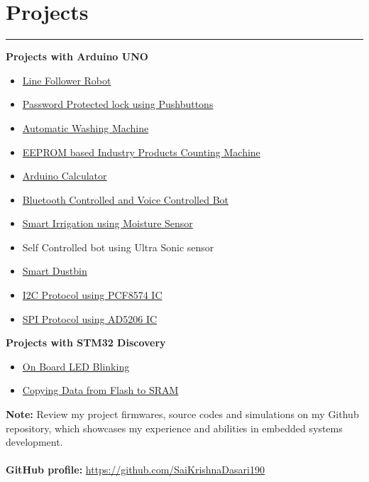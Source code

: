\documentclass[10pt]{article}
\begin{document}
\section*{Projects}
\hrule
\begin{multicols}{3}
\textbf{Projects with Arduino UNO}
\hypersetup{
    linkcolor=black,
    urlcolor=black
}
\begin{itemize}[leftmargin=*]
\item\href{https://github.com/SaiKrishnaDasari190/Arduino-UNO-Projects/tree/main/3.%20Line%20Follower%20Robot}{Line Follower Robot}
\item\href{https://github.com/SaiKrishnaDasari190/Password-Protected-Lock}{Password Protected lock using Pushbuttons}
\item\href{https://github.com/SaiKrishnaDasari190/Automatic-Washing-Machine-using-Arduino-UNO}{Automatic Washing Machine}
\item\href{https://github.com/SaiKrishnaDasari190/EEPROM-Industry-based-Project}{EEPROM based Industry Products Counting Machine} 
\item\href{https://github.com/SaiKrishnaDasari190/Calculator-Using-Arduino}{Arduino Calculator}
\item\href{https://github.com/SaiKrishnaDasari190/Arduino-UNO-Projects/tree/main/4.%20Bluetooth%20Controlled%20Robot}{Bluetooth Controlled and Voice Controlled Bot}
\item\href{https://github.com/SaiKrishnaDasari190/Arduino-UNO-Projects/tree/main/6.%20Smart%20Irrigation%20Using%20Moisture%20Sensor}{Smart Irrigation using Moisture Sensor}
\item Self Controlled bot using Ultra Sonic sensor
\item\href{https://github.com/SaiKrishnaDasari190/Arduino-UNO-Projects/tree/main/7.%20Smart%20Dustbin%20using%20Ultrasonic%20Sensor}{Smart Dustbin}
\item\href{https://github.com/SaiKrishnaDasari190/Arduino-UNO-Projects/tree/main/8.%20I2C%20Protocol%20using%20PCF8574%20IC}{I2C Protocol using PCF8574 IC}
\item\href{https://github.com/SaiKrishnaDasari190/Arduino-UNO-Projects/tree/main/9.%20SPI%20Protocol%20using%20AD5206%20IC}{SPI Protocol using AD5206 IC}
\end{itemize}
\columnbreak
\textbf{Projects with STM32 Discovery}
\begin{itemize}[leftmargin=*]
\item\href{https://github.com/SaiKrishnaDasari190/Password-Protected-Lock}{On Board LED Blinking} 
\item\href{https://github.com/SaiKrishnaDasari190/Password-Protected-Lock}{Copying Data from Flash to SRAM}
\end{itemize}
\end{multicols}
\textbf{Note: }Review my project firmwares, source codes and simulations on my Github repository, which showcases my experience and abilities in embedded systems development.\\\\
\textbf{GitHub profile: }\href{https://github.com/SaiKrishnaDasari190}{https://github.com/SaiKrishnaDasari190}
\end{document}

